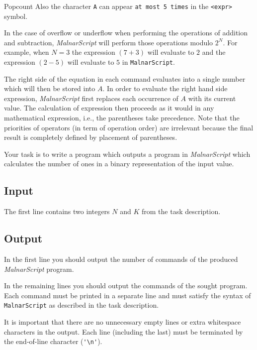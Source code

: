 \begin{statement}[
  problempoints=110,
  timelimit=1 sekunda,
  memorylimit=512 MiB,
]{Popcount}
Also the character \texttt{A} can appear \texttt{at most 5 times} in the
\texttt{<expr>} symbol.

In the case of overflow or underflow when performing the operations of
addition and subtraction, \textit{MalnarScript} will perform those
operations modulo $2^N$. For example, when $N=3$ the expression $(7+3)$ will
evaluate to $2$ and the expression $(2-5)$ will evaluate to $5$ in
\texttt{MalnarScript}.

The right side of the equation in each command evaluates into a single number
which will then be stored into $A$. In order to evaluate the right hand side
expression, \textit{MalnarScript} first replaces each occurrence of $A$ with
its current value. The calculation of expression then proceeds as it would in
any mathematical expression, i.e., the parentheses take precedence. Note that
the priorities of operators (in term of operation order) are irrelevant because
the final result is completely defined by placement of parentheses.

Your task is to write a program which outputs a program in \textit{MalnarScript}
which calculates the number of ones in a binary representation of the input
value.

\subsection*{Input}
The first line contains two integers $N$ and $K$ from the task description.

\subsection*{Output}
In the first line you should output the number of commands of the produced
\textit{MalnarScript} program.

In the remaining lines you should output the commands of the sought program.
Each command must be printed in a separate line and must satisfy the syntax
of \texttt{MalnarScript} as described in the task description.

It is important that there are no unnecessary empty lines or extra whitespace
characters in the output. Each line (including the last) must be terminated by
the end-of-line character (\verb|'\n'|).


\end{statement}

